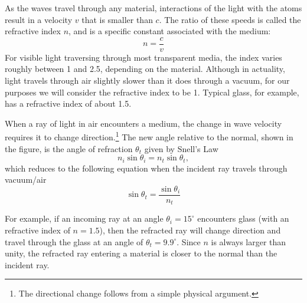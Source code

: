 As the waves travel through any material, interactions of the light with the atoms result in a velocity $v$ that is smaller than $c$. The ratio of these speeds is called the refractive index $n$, and is a specific constant associated with the medium:
\begin{equation}
    n = \frac{c}{v}
\end{equation}
For visible light traversing through most transparent media, the index varies roughly between 1 and 2.5, depending on the material. Although in actuality, light travels through air slightly slower than it does through a vacuum, for our purposes we will consider the refractive index to be 1. Typical glass, for example, has a refractive index of about 1.5.\myskip

When a ray of light in air encounters a medium, the change in wave velocity requires it to change direction.\footnote{The directional change follows from a simple physical argument.}  The new angle relative to the normal, shown in the figure, is the angle of refraction $\theta_{t}$ given by Snell's Law
\begin{equation}
    n_{i}\sin \theta_{i} = n_{t} \sin \theta_{t},
\end{equation}
which reduces to the following equation when the incident ray travels through vacuum/air
\begin{equation}
    \sin \theta_{t} = \frac{\sin \theta_{i}}{n_{t}}
\end{equation}

For example, if an incoming ray at an angle $\theta_{i} = 15^\circ$ encounters glass (with an refractive index of $n = 1.5$), then the refracted ray will change direction and travel through the glass at an angle of $\theta_{t} = 9.9^\circ$.  Since $n$ is always larger than unity, the refracted ray entering a material is closer to the normal than the incident ray.\myskip

